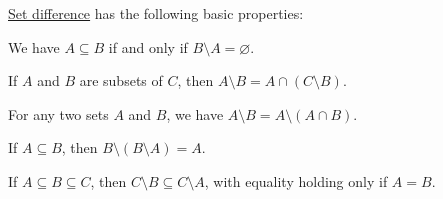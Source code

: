 \begin{proposition}\label{thm:set_difference}
  \hyperref[def:set_difference]{Set difference} has the following basic properties:
  \begin{thmenum}
     We have \( A \subseteq B \) if and only if \( B \setminus A = \varnothing \).

     If \( A \) and \( B \) are subsets of \( C \), then \( A \setminus B = A \cap (C \setminus B) \).

     For any two sets \( A \) and \( B \), we have \( A \setminus B = A \setminus (A \cap B) \).

     If \( A \subseteq B \), then \( B \setminus (B \setminus A) = A \).

     If \( A \subseteq B \subseteq C \), then \( C \setminus B \subseteq C \setminus A \), with equality holding only if \( A = B \).
  \end{thmenum}
\end{proposition}
